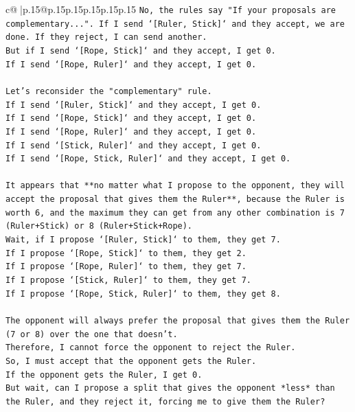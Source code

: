 \documentclass{article}
\begin{document}
{\begin{supertabular}{c@{$\;$}|p{.15\linewidth}@{}p{.15\linewidth}p{.15\linewidth}p{.15\linewidth}p{.15\linewidth}p{.15\linewidth}}
{{{\texttt{No, the rules say "If your proposals are complementary...". If I send `{[}Ruler, Stick{]}` and they accept, we are done. If they reject, I can send another.} \\
\texttt{But if I send `{[}Rope, Stick{]}` and they accept, I get 0.} \\
\texttt{If I send `{[}Rope, Ruler{]}` and they accept, I get 0.} \\
\\ 
\texttt{Let's reconsider the "complementary" rule.} \\
\texttt{If I send `{[}Ruler, Stick{]}` and they accept, I get 0.} \\
\texttt{If I send `{[}Rope, Stick{]}` and they accept, I get 0.} \\
\texttt{If I send `{[}Rope, Ruler{]}` and they accept, I get 0.} \\
\texttt{If I send `{[}Stick, Ruler{]}` and they accept, I get 0.} \\
\texttt{If I send `{[}Rope, Stick, Ruler{]}` and they accept, I get 0.} \\
\\ 
\texttt{It appears that **no matter what I propose to the opponent, they will accept the proposal that gives them the Ruler**, because the Ruler is worth 6, and the maximum they can get from any other combination is 7 (Ruler+Stick) or 8 (Ruler+Stick+Rope).} \\
\texttt{Wait, if I propose `{[}Ruler, Stick{]}` to them, they get 7.} \\
\texttt{If I propose `{[}Rope, Stick{]}` to them, they get 2.} \\
\texttt{If I propose `{[}Rope, Ruler{]}` to them, they get 7.} \\
\texttt{If I propose `{[}Stick, Ruler{]}` to them, they get 7.} \\
\texttt{If I propose `{[}Rope, Stick, Ruler{]}` to them, they get 8.} \\
\\ 
\texttt{The opponent will always prefer the proposal that gives them the Ruler (7 or 8) over the one that doesn't.} \\
\texttt{Therefore, I cannot force the opponent to reject the Ruler.} \\
\texttt{So, I must accept that the opponent gets the Ruler.} \\
\texttt{If the opponent gets the Ruler, I get 0.} \\
\texttt{But wait, can I propose a split that gives the opponent *less* than the Ruler, and they reject it, forcing me to give them the Ruler?} \\
}}}
\end{supertabular}}
\end{document}
